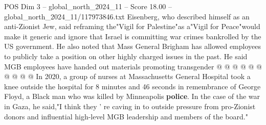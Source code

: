 \begin{textsample}{POS Dim 3 – global\_north\_2024\_11 – Score 18.00 – global\_north\_2024\_11/117973846.txt}
Eisenberg, who described himself as an anti-Zionist Jew, said reframing the"Vigil for Palestine"as a"Vigil for Peace"would make it generic and ignore that Israel is committing war crimes bankrolled by the US government.
He also noted that Mass General Brigham has allowed employees to publicly take a position on other highly charged issues in the past.
He said MGB employees have handed out materials promoting transgender @ @ @ @ @ @ @ @ @ @ In 2020, a group of nurses at Massachusetts General Hospital took a knee outside the hospital for 8 minutes and 46 seconds in remembrance of George Floyd, a Black man who was killed by Minneapolis \textbf{police}.
In the case of the war in Gaza, he said,"I think they ' re caving in to outside pressure from pro-Zionist donors and influential high-level MGB leadership and members of the board."

\end{textsample}

